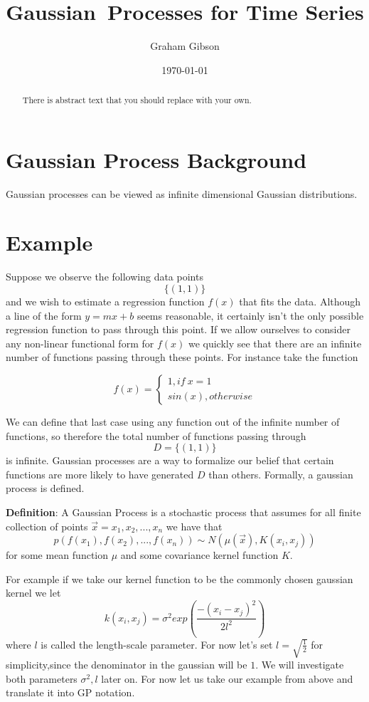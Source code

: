 \documentclass{article}
\begin{document}
\title{Gaussian\ Processes for Time Series}
\author{Graham Gibson}
\date{\today}
\maketitle

\begin{abstract}
    There is abstract text that you should replace with your own. 
\end{abstract}

\tableofcontents

\section{Gaussian Process Background}
Gaussian processes can be viewed as infinite dimensional Gaussian distributions.

\section{Example}
Suppose we observe the following data points 
$$\{(1,1)\}$$ and we wish to estimate a regression function $f(x)$ that fits the data. Although a line of the form $y=mx+b$ seems reasonable, it certainly isn't the only possible regression function to pass through this point. If we allow ourselves to consider any non-linear functional form for $f(x)$ we quickly see that there are an infinite number of functions passing through these points. For instance take the function

$$f(x) = \begin{cases}
1, if\ x=1\\
sin(x), otherwise
\end{cases}$$

We can define that last case using any function out of the infinite number of functions, so therefore the total number of functions passing through $$D = \{(1,1)\}$$ is infinite. Gaussian processes are a way to formalize our belief that certain functions are more likely to have generated $D$ than others. Formally, a gaussian process is defined.

\textbf{Definition}:
A Gaussian Process is a stochastic process that assumes for all finite collection of points $\vec{x}=x_1,x_2,...,x_n$ we have that $$p(f(x_1),f(x_2),...,f(x_n))\sim N(\mu(\vec{x}),K(x_i,x_j))$$ for some mean function $\mu$ and some covariance kernel function $K$. 

For example if we take our kernel function to be the commonly chosen gaussian kernel we let $$k(x_i,x_j)=\sigma^2exp(\frac{-(x_i-x_j)^2}{2l^2})$$
where $l$ is called the length-scale parameter. For now let's set $l=\sqrt{\frac{1}{2}}$ for simplicity,since the denominator in the gaussian will be $1$. We will investigate both parameters $\sigma^2,l$ later on. For now let us take our example from above and translate it into GP notation.
\end{document}
